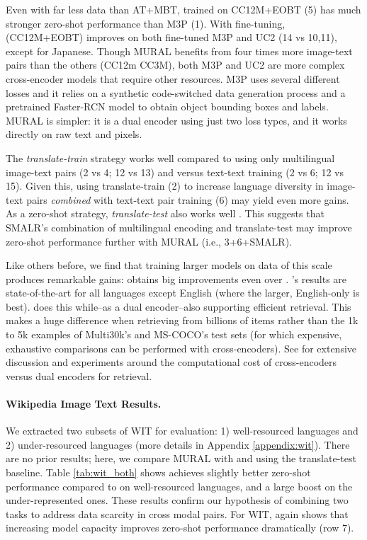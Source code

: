         
        Even with far less data than AT+MBT, \muralbase trained on CC12M+EOBT (5) has much stronger zero-shot performance than M3P (1). With fine-tuning, \muralbase (CC12M+EOBT) improves on both fine-tuned M3P and UC2 (14 vs 10,11), except for Japanese. Though MURAL benefits from four times more image-text pairs than the others (CC12m  CC3M), both M3P and UC2 are more complex cross-encoder models that require other resources. M3P uses several different losses and it relies on a synthetic code-switched data generation process and a pretrained Faster-RCN model to obtain object bounding boxes and labels. MURAL is simpler: it is a dual encoder using just two loss types, and it works directly on raw text and pixels.
        
        
        
        The \textit{translate-train} strategy works well compared to using only multilingual image-text pairs (2 vs 4; 12 vs 13) and versus text-text training (2 vs 6; 12 vs 15). Given this, using translate-train (2) to increase language diversity in image-text pairs \textit{combined} with text-text pair training (6) may yield even more gains. As a zero-shot strategy, \textit{translate-test} also works well . This suggests that SMALR's combination of multilingual encoding and translate-test \cite{burns2020eccv} may improve zero-shot performance further with MURAL (i.e., 3+6+SMALR).
        
        Like others before, we find that training larger models on data of this scale produces remarkable gains: \murallarge obtains big improvements even over \muralbase. \murallarge's results are state-of-the-art for all languages except English (where the larger, English-only \alignhuge is best). \murallarge does this while--as a dual encoder--also supporting efficient retrieval. This makes a huge difference when retrieving from billions of items rather than the 1k to 5k examples of Multi30k's and MS-COCO's test sets (for which expensive, exhaustive comparisons can be performed with cross-encoders). See \citet{geigle-etal-retrieval} for extensive discussion and experiments around the computational cost of cross-encoders versus dual encoders for retrieval.
        






        \paragraph{Wikipedia Image Text Results.} We extracted two subsets of WIT for evaluation: 1) well-resourced languages and 2) under-resourced languages (more details in Appendix \ref{appendix:wit}). There are no prior results; here, we compare MURAL with \alignmling and \alignen using the translate-test baseline. Table \ref{tab:wit_both} shows \muralbase achieves slightly better zero-shot performance compared to \alignmling on well-resourced languages, and a large boost on the under-represented ones. These results confirm our hypothesis of combining two tasks to address data scarcity in cross modal pairs. For WIT, \murallarge again shows that increasing model capacity improves zero-shot performance dramatically (row 7).
        
